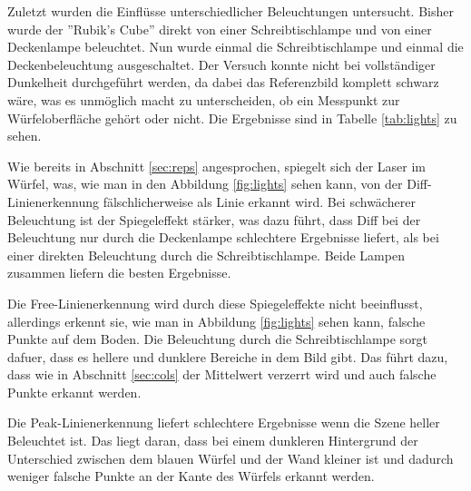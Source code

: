 \documentclass[ngerman,a4paper,parskip=half]{scrartcl}
\begin{document}
Zuletzt wurden die Einflüsse unterschiedlicher Beleuchtungen untersucht. Bisher wurde der ''Rubik's Cube'' direkt von einer Schreibtischlampe und von einer Deckenlampe beleuchtet. Nun wurde einmal die Schreibtischlampe und einmal die Deckenbeleuchtung ausgeschaltet. Der Versuch konnte nicht bei vollständiger Dunkelheit durchgeführt werden, da dabei das Referenzbild komplett schwarz wäre, was es unmöglich macht zu unterscheiden, ob ein Messpunkt zur Würfeloberfläche gehört oder nicht. Die Ergebnisse sind in Tabelle \ref{tab:lights} zu sehen.

Wie bereits in Abschnitt \ref{sec:reps} angesprochen, spiegelt sich der Laser im Würfel, was, wie man in den Abbildung \ref{fig:lights} sehen kann, von der Diff-Linienerkennung fälschlicherweise als Linie erkannt wird. Bei schwächerer Beleuchtung ist der Spiegeleffekt stärker, was dazu führt, dass Diff bei der Beleuchtung nur durch die Deckenlampe schlechtere Ergebnisse liefert, als bei einer direkten Beleuchtung durch die Schreibtischlampe. Beide Lampen zusammen liefern die besten Ergebnisse.

Die Free-Linienerkennung wird durch diese Spiegeleffekte nicht beeinflusst, allerdings erkennt sie, wie man in Abbildung \ref{fig:lights} sehen kann, falsche Punkte auf dem Boden. Die Beleuchtung durch die Schreibtischlampe sorgt dafuer, dass es hellere und dunklere Bereiche in dem Bild gibt. Das führt dazu, dass wie in Abschnitt \ref{sec:cols} der Mittelwert verzerrt wird und auch falsche Punkte erkannt werden.

Die Peak-Linienerkennung liefert schlechtere Ergebnisse wenn die Szene heller Beleuchtet ist. Das liegt daran, dass bei einem dunkleren Hintergrund der Unterschied zwischen dem blauen Würfel und der Wand kleiner ist und dadurch weniger falsche Punkte an der Kante des Würfels erkannt werden.
\end{document}
